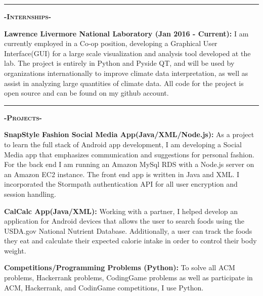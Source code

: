 \documentclass[12pt]{article}
\begin{document}
\noindent\rule{19cm}{0.4pt}

\begin{center}
\textbf{\textsc{-Internships-}}\\
\end{center}
\begin{footnotesize}

\flushleft
\color{Cerulean}\textbf{Lawrence Livermore National Laboratory (Jan 2016 - Current):} 
\color{Black}I am currently employed in a Co-op position, developing a Graphical User Interface(GUI) for a large scale visualization and analysis tool developed at the lab. The project is entirely in \color{TealBlue}Python and Pyside QT, \color{Black} and will be used by organizations internationally to improve climate data interpretation, as well as assist in analyzing large quantities of climate data. All code for the project is open source and can be found on my github account.\\
\smallskip
\end{footnotesize}

\noindent\rule{19cm}{0.4pt}

\begin{center}
\textbf{\textsc{-Projects-}}\\
\end{center}
\begin{footnotesize}

\flushleft
\color{Cerulean}\textbf{SnapStyle Fashion Social Media App(Java/XML/Node.js):} 
\color{Black}As a project to learn the full stack of Android app development, I am developing a Social Media app that emphasizes communication and suggestions for personal fashion. For the back end I am running an \color{TealBlue}Amazon MySql RDS \color{Black}with a \color{TealBlue}Node.js \color{Black} server on an \color{TealBlue}Amazon EC2 \color{Black}instance. The front end app is written in \color{TealBlue}Java and XML. \color{Black} I incorporated the \color{TealBlue}Stormpath \color{Black}authentication API for all user encryption and session handling.\\
\smallskip

\color{Cerulean}\textbf{CalCalc App(Java/XML):}
\color{Black}Working with a partner, I helped develop an application for Android devices that allows the user to search foods using the USDA.gov National Nutrient Database. Additionally, a user can track the foods they eat and calculate their expected calorie intake in order to control their body weight.\\
\smallskip


\color{Cerulean}\textbf{Competitions/Programming Problems (Python):}
\color{Black}To solve all ACM problems, Hackerrank problems, CodingGame problems as well as participate in ACM, Hackerrank, and CodinGame competitions, I use \color{TealBlue}Python.\color{Black}

\end{footnotesize}
\end{document}
